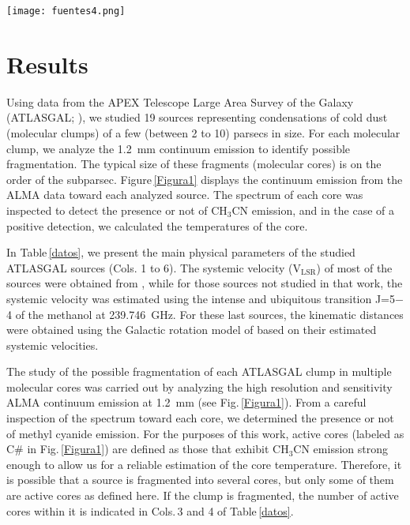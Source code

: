 \documentclass[baaa]{baaa}
\begin{document}
\begin{figure*}[!t]
\centering
\texttt{[image: fuentes4.png]}
\caption{ ALMA continuum emission at 1.2 mm toward the 19 ATLASGAL sources analyzed in this work, represented by colors and contours (at levels 0.001 Jy beam$^{-1}$ to 0.01 Jy beam$^{-1}$). The active cores (C\#) are indicated for each source. The maps are in Galactic coordinates. The beam of the continuum emission at 250~GHz is shown in the bottom right corner of each panel.}
\label{Figura1}
\end{figure*}

\section{Results}

Using data from the APEX Telescope Large Area Survey of the Galaxy (ATLASGAL; \citealt{atla}), we studied 19 sources representing condensations of cold dust (molecular clumps) of a few (between 2 to 10) parsecs in size. For each molecular clump, we analyze the 1.2~mm continuum emission to identify possible fragmentation. The typical size of these fragments (molecular cores) is on the order of the subparsec. 
Figure\,\ref{Figura1} displays the continuum emission from the ALMA data toward each analyzed source. The spectrum of each core was inspected to detect the presence or not of CH$_3$CN emission, and in the case of a positive detection, we calculated the temperatures of the core.

In Table\,\ref{datos}, we present the  main physical parameters of the studied ATLASGAL sources (Cols. 1 to 6). The systemic velocity (V$_\mathrm{LSR}$) of most of the sources were obtained from \citet{wienen2015},  while for those sources not studied in that work, the systemic velocity was estimated using the intense and ubiquitous transition J=5$-$4 of the methanol at 239.746~GHz. For these last sources, the kinematic distances were obtained using the Galactic rotation model of \citet{brand93} based on their estimated systemic velocities.

The study of the possible fragmentation of each ATLASGAL clump in multiple molecular cores was carried out by analyzing the high resolution and sensitivity ALMA continuum  emission at 1.2~mm (see Fig.\,\ref{Figura1}). From a careful inspection of the spectrum toward each core, we determined the presence or not of methyl cyanide emission. For the purposes of this work, active cores (labeled as C\# in Fig.\,\ref{Figura1}) are defined as those that exhibit CH$_3$CN emission strong enough to allow us for a reliable estimation of the core temperature. Therefore, it is possible that a source is fragmented into several cores, but only some of them are active cores as defined here. If the clump is fragmented, the number of active cores within it is indicated in Cols.\,3 and 4 of Table\,\ref{datos}.
 
\end{document}
